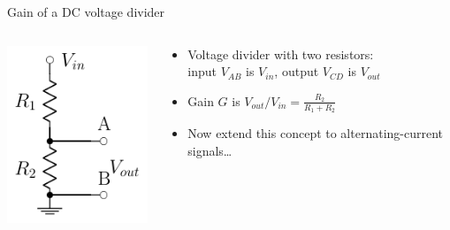 \documentclass[beamer]{standalone}
\begin{document}
\begin{frame}[t]
\begin{block}{Gain of a DC voltage divider}
\begin{columns}
\begin{column}{0.2\textwidth}
    \includegraphics[width=\textwidth]{pics/Voltage_divider}
   \end{column}
   \begin{column}{0.8\textwidth}
    \begin{itemize}
     \item Voltage divider with two resistors: \\ input $V_{AB}$ is $V_{in}$, output $V_{CD}$ is $V_{out}$
     \item Gain $G$ is $V_{out} / V_{in} = \frac{R_2}{R_1 + R_2}$
     \item Now extend this concept to alternating-current signals\ldots
    \end{itemize}
   \end{column}
  \end{columns}
 \end{block}
\end{frame}
\end{document}

